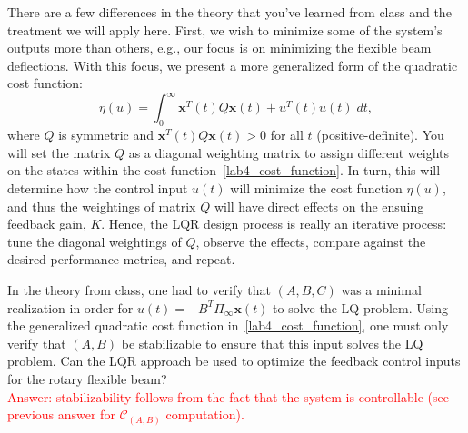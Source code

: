 \documentclass[12pt]{report}
\newcommand\drew[1]{\textcolor{red}{#1}}
\begin{document}
There are a few differences in the theory that you've learned from class and the treatment we will apply here. First, we wish to minimize some of the system's outputs more than others, e.g., our focus is on minimizing the flexible beam deflections. With this focus, we present a more generalized form of the quadratic cost function:
\begin{equation}\label{lab4_cost_function}
    \eta(u) = \int_0^{\infty} \mathbf{x}^T(t) Q \mathbf{x}(t) + u^T(t)u(t) \; dt,
\end{equation}
where $Q$ is symmetric and $\mathbf{x}^T(t) Q \mathbf{x}(t) > 0$ for all $t$ (positive-definite). You will set the matrix $Q$ as a diagonal weighting matrix to assign different weights on the states within the cost function~\eqref{lab4_cost_function}. In turn, this will determine how the control input $u(t)$ will minimize the cost function $\eta(u)$, and thus the weightings of matrix $Q$ will have direct effects on the ensuing feedback gain, $K$. Hence, the LQR design process is really an iterative process: tune the diagonal weightings of $Q$, observe the effects, compare against the desired performance metrics, and repeat.

In the theory from class, one had to verify that $(A,B,C)$ was a minimal realization in order for $u(t)=-B^T \Pi_{\infty} \mathbf{x}(t)$ to solve the LQ problem. Using the generalized quadratic cost function in~\eqref{lab4_cost_function}, one must only verify that $(A,B)$ be stabilizable to ensure that this input solves the LQ problem. Can the LQR approach be used to optimize the feedback control inputs for the rotary flexible beam?\\
\drew{Answer: stabilizability follows from the fact that the system is controllable (see previous answer for $\mathcal{C}_{(A,B)}$ computation).}
\end{document}
